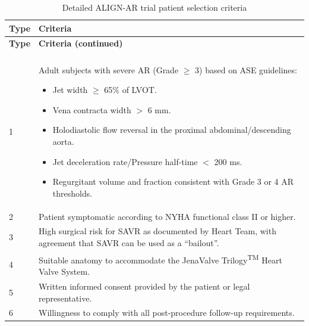 \documentclass[nols]{tufte-book}
\begin{document}
\begin{longtable}{p{}p{}}
\caption{Detailed ALIGN-AR trial patient selection criteria}
\hline
\textbf{Type} & \textbf{Criteria} \\ \hline
\endfirsthead
\hline
\textbf{Type} & \textbf{Criteria (continued)} \\ \hline
\endhead
\hline
\endfoot

\multicolumn{2}{l}{\textbf{Inclusion Criteria}} \\ \hline
1 & Adult subjects with severe AR (Grade $\geq$ 3) based on ASE guidelines:
    \begin{itemize}
        \item Jet width $\geq$ 65\% of LVOT.
        \item Vena contracta width $>$ 6 mm.
        \item Holodiastolic flow reversal in the proximal abdominal/descending aorta.
        \item Jet deceleration rate/Pressure half-time $<$ 200 ms.
        \item Regurgitant volume and fraction consistent with Grade 3 or 4 AR thresholds.
    \end{itemize} \\ \hline
2 & Patient symptomatic according to NYHA functional class II or higher. \\ \hline
3 & High surgical risk for SAVR as documented by Heart Team, with agreement that SAVR can be used as a ``bailout''. \\ \hline
4 & Suitable anatomy to accommodate the JenaValve Trilogy\textsuperscript{TM} Heart Valve System. \\ \hline
5 & Written informed consent provided by the patient or legal representative. \\ \hline
6 & Willingness to comply with all post-procedure follow-up requirements. \\ \hline


\end{longtable}
\end{document}
